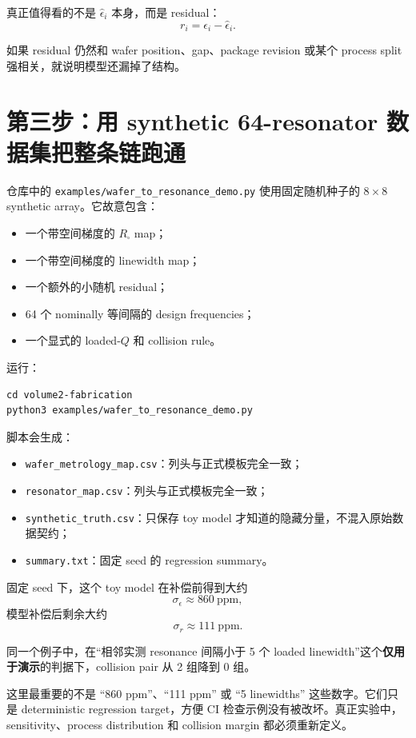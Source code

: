 真正值得看的不是 $\hat{\epsilon}_i$ 本身，而是 residual：
\[
r_i=\epsilon_i-\hat{\epsilon}_i.
\]

如果 residual 仍然和 wafer position、gap、package revision 或某个 process split 强相关，就说明模型还漏掉了结构。

\section{第三步：用 synthetic 64-resonator 数据集把整条链跑通}

仓库中的 \texttt{examples/wafer\_to\_resonance\_demo.py} 使用固定随机种子的 $8\times8$ synthetic array。它故意包含：

\begin{itemize}
  \item 一个带空间梯度的 $R_\square$ map；
  \item 一个带空间梯度的 linewidth map；
  \item 一个额外的小随机 residual；
  \item 64 个 nominally 等间隔的 design frequencies；
  \item 一个显式的 loaded-$Q$ 和 collision rule。
\end{itemize}

运行：

\begin{verbatim}
cd volume2-fabrication
python3 examples/wafer_to_resonance_demo.py
\end{verbatim}

脚本会生成：

\begin{itemize}
  \item \texttt{wafer\_metrology\_map.csv}：列头与正式模板完全一致；
  \item \texttt{resonator\_map.csv}：列头与正式模板完全一致；
  \item \texttt{synthetic\_truth.csv}：只保存 toy model 才知道的隐藏分量，不混入原始数据契约；
  \item \texttt{summary.txt}：固定 seed 的 regression summary。
\end{itemize}

固定 seed 下，这个 toy model 在补偿前得到大约
\[
\sigma_{\epsilon}\approx 860~\mathrm{ppm},
\]
模型补偿后剩余大约
\[
\sigma_{r}\approx 111~\mathrm{ppm}.
\]

同一个例子中，在“相邻实测 resonance 间隔小于 5 个 loaded linewidth”这个\textbf{仅用于演示}的判据下，collision pair 从 2 组降到 0 组。

\begin{warningbox}
这里最重要的不是 ``860 ppm''、``111 ppm'' 或 ``5 linewidths'' 这些数字。它们只是 deterministic regression target，方便 CI 检查示例没有被改坏。真正实验中，sensitivity、process distribution 和 collision margin 都必须重新定义。
\end{warningbox}

